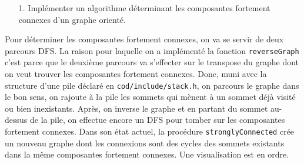\documentclass[10pt]{article} %
\begin{document}
\begin{itemize}
    \item [1.] Implémenter un algorithme déterminant les composantes fortement connexes d'un graphe orienté.
\end{itemize}

Pour déterminer les composantes fortement connexes, on va se servir de deux parcours DFS. La raison pour laquelle on a implémenté la fonction
\texttt{reverseGraph} c'est parce que le deuxième parcours va s'effecter sur le transpose du graphe dont on veut trouver les composantes fortement connexes. Donc,
muni avec la structure d'une pile déclaré en \texttt{cod/include/stack.h}, on parcours le graphe dans le bon sens, on rajoute à la pile les sommets qui mènent à un
sommet déjà visité ou bien inexistants. Après, on inverse le graphe et en partant du sommet au-dessus de la pile, on effectue encore un DFS pour tomber sur les composantes fortement
connexes. Dans son état actuel, la procédure \texttt{stronglyConnected} crée un nouveau graphe dont les connexions sont des cycles des sommets existants dans la même composantes
fortement connexes. Une visualisation est en ordre.
\end{document}
